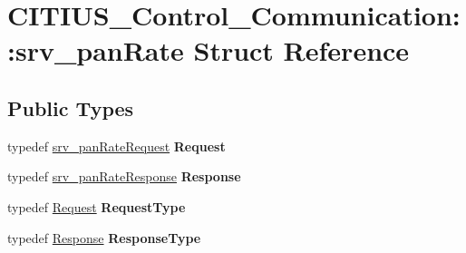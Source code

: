 \hypertarget{struct_c_i_t_i_u_s___control___communication_1_1srv__pan_rate}{\section{\-C\-I\-T\-I\-U\-S\-\_\-\-Control\-\_\-\-Communication\-:\-:srv\-\_\-pan\-Rate \-Struct \-Reference}
\label{struct_c_i_t_i_u_s___control___communication_1_1srv__pan_rate}
}
\subsection*{\-Public \-Types}
\begin{DoxyCompactItemize}
\item 
\hypertarget{struct_c_i_t_i_u_s___control___communication_1_1srv__pan_rate_ae6e185d673c3eba88738acabc13c0320}{typedef \hyperlink{struct_c_i_t_i_u_s___control___communication_1_1srv__pan_rate_request__}{srv\-\_\-pan\-Rate\-Request} {\bfseries \-Request}}\label{struct_c_i_t_i_u_s___control___communication_1_1srv__pan_rate_ae6e185d673c3eba88738acabc13c0320}

\item 
\hypertarget{struct_c_i_t_i_u_s___control___communication_1_1srv__pan_rate_abdfa31ceed7b661b264666f959b1cec5}{typedef \hyperlink{struct_c_i_t_i_u_s___control___communication_1_1srv__pan_rate_response__}{srv\-\_\-pan\-Rate\-Response} {\bfseries \-Response}}\label{struct_c_i_t_i_u_s___control___communication_1_1srv__pan_rate_abdfa31ceed7b661b264666f959b1cec5}

\item 
\hypertarget{struct_c_i_t_i_u_s___control___communication_1_1srv__pan_rate_a4761dab28044ecb3f7e56ed44128b597}{typedef \hyperlink{struct_c_i_t_i_u_s___control___communication_1_1srv__pan_rate_request__}{\-Request} {\bfseries \-Request\-Type}}\label{struct_c_i_t_i_u_s___control___communication_1_1srv__pan_rate_a4761dab28044ecb3f7e56ed44128b597}

\item 
\hypertarget{struct_c_i_t_i_u_s___control___communication_1_1srv__pan_rate_a46a811ddbbabeb524f37ad8a24a1f97a}{typedef \hyperlink{struct_c_i_t_i_u_s___control___communication_1_1srv__pan_rate_response__}{\-Response} {\bfseries \-Response\-Type}}\label{struct_c_i_t_i_u_s___control___communication_1_1srv__pan_rate_a46a811ddbbabeb524f37ad8a24a1f97a}

\end{DoxyCompactItemize}

